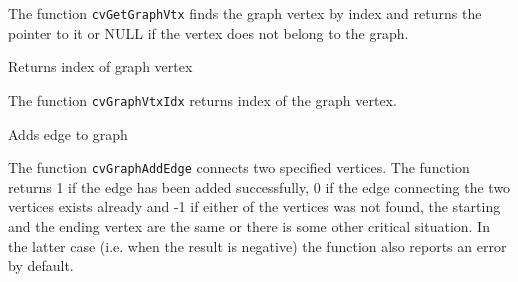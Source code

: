 The function \texttt{cvGetGraphVtx} finds the graph vertex by index and returns the pointer to it or NULL if the vertex does not belong to the graph.


\label{GraphVtxIdx}

Returns index of graph vertex


\begin{description}
\end{description}

The function \texttt{cvGraphVtxIdx} returns index of the graph vertex.

\label{GraphAddEdge}

Adds edge to graph


\begin{description}
\end{description}


The function \texttt{cvGraphAddEdge} connects two specified vertices. The function returns 1 if the edge has been added successfully, 0 if the edge connecting the two vertices exists already and -1 if either of the vertices was not found, the starting and the ending vertex are the same or there is some other critical situation. In the latter case (i.e. when the result is negative) the function also reports an error by default.

